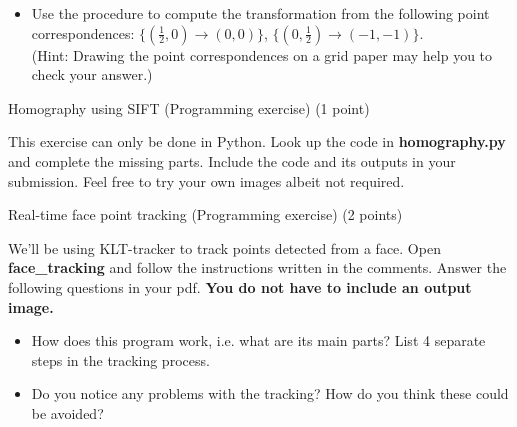 \documentclass[12pt]{article} %
\newenvironment{exercise}[2][Task]{\begin{trivlist}
\item[\hskip \labelsep {\bfseries #1}\hskip \labelsep {\bfseries #2.}]}{\end{trivlist}}
\begin{document}
\begin{exercise}{1}
\begin{itemize}
\item[\textit{d)}] Use the procedure to compute the transformation from the following point correspondences: $\{(\frac{1}{2},0)\rightarrow(0,0)\}$, $\{(0,\frac{1}{2})\rightarrow(-1,-1)\}$. \\(Hint: Drawing the point correspondences on a grid paper may help you to check your answer.)

\end{itemize}

\vspace{1mm}



\end{exercise}

\vspace{5mm}

\begin{exercise}{2}
    Homography using SIFT (Programming exercise) (1 point)
    
    \noindent This exercise can only be done in Python. Look up the code in \textbf{homography.py} and complete the missing parts. Include the code and its outputs in your submission. Feel free to try your own images albeit not required.
\end{exercise}
\vspace{5mm}
\begin{exercise}{3}
	Real-time face point tracking (Programming exercise) (2 points)
	
	\noindent We'll be using KLT-tracker to track points detected from a face. Open \textbf{face\_tracking} and follow the instructions written in the comments.
	Answer the following questions in your pdf.
	\textbf{You do not have to include an output image.}
	
	\begin{itemize}
		\item[\textit{a)}] How does this program work, i.e. what are its main parts? List 4 separate steps in the tracking process.
		\item[\textit{b)}] Do you notice any problems with the tracking? How do you think these could be avoided?

	\end{itemize}
	
\end{exercise}
\end{document}
